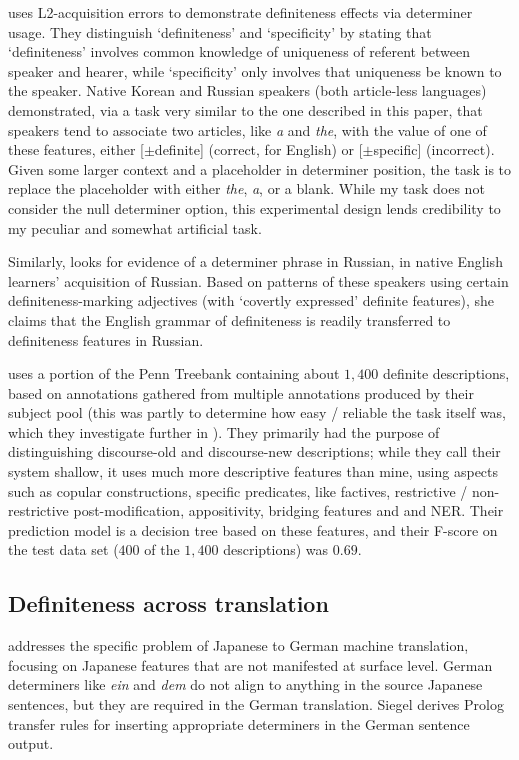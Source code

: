 \documentclass[11pt]{article}
\begin{document}
\citet{ko:2009} uses L2-acquisition errors to demonstrate definiteness effects via determiner usage. They distinguish `definiteness' and `specificity' by stating that `definiteness' involves common knowledge of uniqueness of referent between speaker and hearer, while `specificity' only involves that uniqueness be known to the speaker. Native Korean and Russian speakers (both article-less languages) demonstrated, via a task very similar to the one described in this paper, that speakers tend to associate two articles, like \emph{a} and \emph{the}, with the value of one of these features, either [$\pm$definite] (correct, for English) or [$\pm$specific] (incorrect). Given some larger context and a placeholder in determiner position, the task is to replace the placeholder with either \emph{the}, \emph{a}, or a blank. While my task does not consider the null determiner option, this experimental design lends credibility to my peculiar and somewhat artificial task.

Similarly, \citet{cho:2011} looks for evidence of a determiner phrase in Russian, in native English learners' acquisition of Russian. Based on patterns of these speakers using certain definiteness-marking adjectives (with `covertly expressed' definite features), she claims that the English grammar of definiteness is readily transferred to definiteness features in Russian.

\citet{vieira:2000} uses a portion of the Penn Treebank containing about $1,400$ definite descriptions, based on annotations gathered from multiple annotations produced by their subject pool (this was partly to determine how easy / reliable the task itself was, which they investigate further in \citet{poesio:1998}). They primarily had the purpose of distinguishing discourse-old and discourse-new descriptions; while they call their system shallow, it uses much more descriptive features than mine, using aspects such as copular constructions, specific predicates, like factives, restrictive / non-restrictive post-modification, appositivity, bridging features and and NER. Their prediction model is a decision tree based on these features, and their F-score on the test data set ($400$ of the $1,400$ descriptions) was $0.69$.

\subsection{Definiteness across translation}

\citet{siegel:1996} addresses the specific problem of Japanese to German machine translation, focusing on Japanese features that are not manifested at surface level.
German determiners like \emph{ein} and \emph{dem} do not align to anything in the source Japanese sentences, but they are required in the German translation. Siegel derives Prolog transfer rules for inserting appropriate determiners in the German sentence output.
\end{document}
